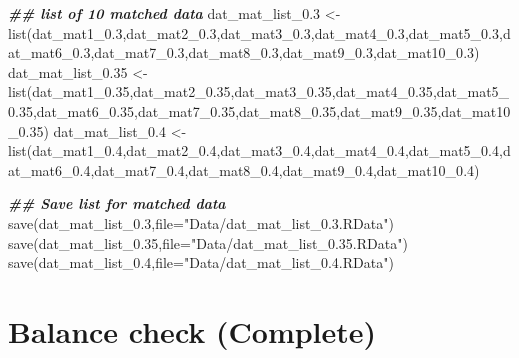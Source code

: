 \documentclass[
]{book}
\newenvironment{Shaded}{\begin{snugshade}}{\end{snugshade}}
\newcommand{\AttributeTok}[1]{\textcolor[rgb]{0.77,0.63,0.00}{#1}}
\newcommand{\DocumentationTok}[1]{\textcolor[rgb]{0.56,0.35,0.01}{\textbf{\textit{#1}}}}
\newcommand{\FloatTok}[1]{\textcolor[rgb]{0.00,0.00,0.81}{#1}}
\newcommand{\FunctionTok}[1]{\textcolor[rgb]{0.00,0.00,0.00}{#1}}
\newcommand{\NormalTok}[1]{#1}
\newcommand{\OtherTok}[1]{\textcolor[rgb]{0.56,0.35,0.01}{#1}}
\newcommand{\StringTok}[1]{\textcolor[rgb]{0.31,0.60,0.02}{#1}}
\theoremstyle{definition}
\theoremstyle{definition}
\theoremstyle{definition}
\theoremstyle{definition}
\theoremstyle{remark}
\begin{document}
\begin{Shaded}
\begin{Highlighting}[]
\DocumentationTok{\#\# list of 10 matched data }
\NormalTok{dat\_mat\_list\_0}\FloatTok{.3} \OtherTok{\textless{}{-}} \FunctionTok{list}\NormalTok{(dat\_mat1\_0}\FloatTok{.3}\NormalTok{,dat\_mat2\_0}\FloatTok{.3}\NormalTok{,dat\_mat3\_0}\FloatTok{.3}\NormalTok{,dat\_mat4\_0}\FloatTok{.3}\NormalTok{,dat\_mat5\_0}\FloatTok{.3}\NormalTok{,dat\_mat6\_0}\FloatTok{.3}\NormalTok{,dat\_mat7\_0}\FloatTok{.3}\NormalTok{,dat\_mat8\_0}\FloatTok{.3}\NormalTok{,dat\_mat9\_0}\FloatTok{.3}\NormalTok{,dat\_mat10\_0}\FloatTok{.3}\NormalTok{)}
\NormalTok{dat\_mat\_list\_0}\FloatTok{.35} \OtherTok{\textless{}{-}} \FunctionTok{list}\NormalTok{(dat\_mat1\_0}\FloatTok{.35}\NormalTok{,dat\_mat2\_0}\FloatTok{.35}\NormalTok{,dat\_mat3\_0}\FloatTok{.35}\NormalTok{,dat\_mat4\_0}\FloatTok{.35}\NormalTok{,dat\_mat5\_0}\FloatTok{.35}\NormalTok{,dat\_mat6\_0}\FloatTok{.35}\NormalTok{,dat\_mat7\_0}\FloatTok{.35}\NormalTok{,dat\_mat8\_0}\FloatTok{.35}\NormalTok{,dat\_mat9\_0}\FloatTok{.35}\NormalTok{,dat\_mat10\_0}\FloatTok{.35}\NormalTok{)}
\NormalTok{dat\_mat\_list\_0}\FloatTok{.4} \OtherTok{\textless{}{-}} \FunctionTok{list}\NormalTok{(dat\_mat1\_0}\FloatTok{.4}\NormalTok{,dat\_mat2\_0}\FloatTok{.4}\NormalTok{,dat\_mat3\_0}\FloatTok{.4}\NormalTok{,dat\_mat4\_0}\FloatTok{.4}\NormalTok{,dat\_mat5\_0}\FloatTok{.4}\NormalTok{,dat\_mat6\_0}\FloatTok{.4}\NormalTok{,dat\_mat7\_0}\FloatTok{.4}\NormalTok{,dat\_mat8\_0}\FloatTok{.4}\NormalTok{,dat\_mat9\_0}\FloatTok{.4}\NormalTok{,dat\_mat10\_0}\FloatTok{.4}\NormalTok{)}

\DocumentationTok{\#\# Save list for matched data}
\FunctionTok{save}\NormalTok{(dat\_mat\_list\_0}\FloatTok{.3}\NormalTok{,}\AttributeTok{file=}\StringTok{"Data/dat\_mat\_list\_0.3.RData"}\NormalTok{)}
\FunctionTok{save}\NormalTok{(dat\_mat\_list\_0}\FloatTok{.35}\NormalTok{,}\AttributeTok{file=}\StringTok{"Data/dat\_mat\_list\_0.35.RData"}\NormalTok{)}
\FunctionTok{save}\NormalTok{(dat\_mat\_list\_0}\FloatTok{.4}\NormalTok{,}\AttributeTok{file=}\StringTok{"Data/dat\_mat\_list\_0.4.RData"}\NormalTok{)}
\end{Highlighting}
\end{Shaded}

\hypertarget{balance-check-complete-1}{%
\section{Balance check (Complete)}\label{balance-check-complete-1}}
\end{document}
